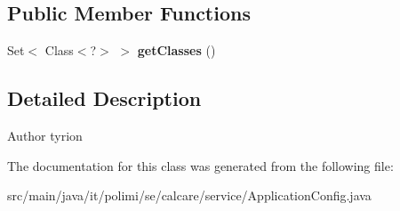 \subsection*{Public Member Functions}
\begin{DoxyCompactItemize}
\item 
\hypertarget{classit_1_1polimi_1_1se_1_1calcare_1_1service_1_1ApplicationConfig_a67890a3a721a56b4172cb7d9f0be94cd}{}Set$<$ Class$<$?$>$ $>$ {\bfseries get\+Classes} ()\label{classit_1_1polimi_1_1se_1_1calcare_1_1service_1_1ApplicationConfig_a67890a3a721a56b4172cb7d9f0be94cd}

\end{DoxyCompactItemize}


\subsection{Detailed Description}
\begin{DoxyAuthor}{Author}
tyrion 
\end{DoxyAuthor}


The documentation for this class was generated from the following file\+:\begin{DoxyCompactItemize}
\item 
src/main/java/it/polimi/se/calcare/service/Application\+Config.\+java\end{DoxyCompactItemize}
